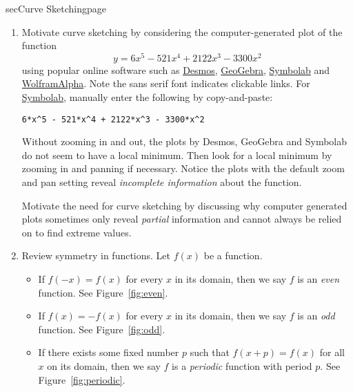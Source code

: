 \documentclass[../main]{subfiles}
\begin{document}
\begin{outline}{sec}{Curve Sketching}{page} \label{outline:curve-sketching}
  \begin{enumerate}
    \item Motivate curve sketching by considering the computer-generated plot of the function
      \[
        y = 6 x^{5} - 521 x^{4} + 2122 x^{3} - 3300 x^{2}
      \]
      using popular online software such as \href{https://www.desmos.com/calculator/9njuthdtv5}{\textsf{Desmos}}, \href{https://www.geogebra.org/calculator/cpjqfsen}{\textsf{GeoGebra}}, \href{https://www.symbolab.com/graphing-calculator}{\textsf{Symbolab}} and \href{https://www.wolframalpha.com/input?i=plot+6*x%5E5+-+521*x%5E4+%2B+2122*x%5E3+-+3300*x%5E2}{\textsf{WolframAlpha}}. Note the sans serif font indicates clickable links. For \href{https://www.symbolab.com/graphing-calculator}{\textsf{Symbolab}}, manually enter the following by copy-and-paste: 
        \begin{center}
          \verb!6*x^5 - 521*x^4 + 2122*x^3 - 3300*x^2!
        \end{center}
        Without zooming in and out, the plots by Desmos, GeoGebra and Symbolab do not seem to have a local minimum. Then look for a local minimum by zooming in and panning if necessary. Notice the plots with the default zoom and pan setting reveal \emph{incomplete information} about the function. 

        Motivate the need for curve sketching by discussing why computer generated plots sometimes only reveal \emph{partial} information and cannot always be relied on to find extreme values.
    \item Review symmetry in functions. Let \(f(x)\) be a function.
      \begin{itemize}
        \item If \(f(-x) = f(x)\) for every \(x\) in its domain, then we say \(f\) is an \emph{even} function. See Figure~\ref{fig:even}.
        \item If \(f(x) = -f(x)\) for every \(x\) in its domain, then we say \(f\) is an \emph{odd} function. See Figure~\ref{fig:odd}.
        \item If there exists some fixed number \(p\) such that \(f(x + p) = f(x)\) for all \(x\) on its domain, then we say \(f\) is a \emph{periodic} function with period \(p\). See Figure~\ref{fig:periodic}.
      \end{itemize}
      


\end{enumerate}
\end{outline}
\end{document}
